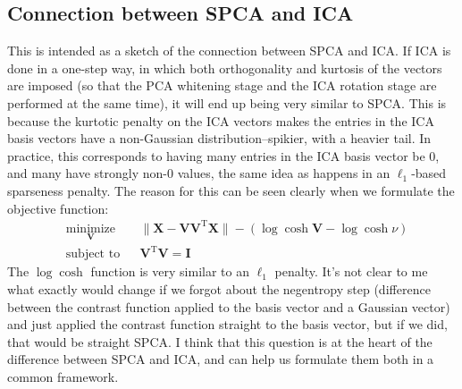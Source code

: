 \documentclass{article}
\newcommand{\transpose}{^\mathrm{T}}
\begin{document}
\subsection*{Connection between SPCA and ICA}
This is intended as a sketch of the connection between SPCA and ICA.  If ICA is done in a one-step way, in which both orthogonality and kurtosis of the vectors are imposed (so that the PCA whitening stage and the ICA rotation stage are performed at the same time), it will end up being very similar to SPCA.  This is because the kurtotic penalty on the ICA vectors makes the entries in the ICA basis vectors have a non-Gaussian distribution--spikier, with a heavier tail.  In practice, this corresponds to having many entries in the ICA basis vector be 0, and many have strongly non-0 values, the same idea as happens in an $\ell_1$-based sparseness penalty.  The reason for this can be seen clearly when we formulate the objective function: 
 \begin{equation}
\begin{aligned}
&\underset{\mathbf{V}}{\text{minimize}} && \|\mathbf{X} - \mathbf{VV}\transpose \mathbf{X}\| - (\log \cosh \mathbf{V} - \log \cosh \nu)  \\ 
& \text{subject to} & & \mathbf{V}\transpose\mathbf{V} = \mathbf{I}
\end{aligned}
\end{equation}
The $\log \cosh$ function is very similar to an $\ell_1$ penalty.  It's not clear to me what exactly would change if we forgot about the negentropy step (difference between the contrast function applied to the basis vector and a Gaussian vector) and just applied the contrast function straight to the basis vector, but if we did, that would be straight SPCA.  I think that this question is at the heart of the difference between SPCA and ICA, and can help us formulate them both in a common framework. 


\end{document}
